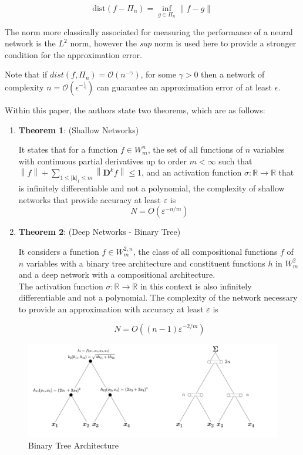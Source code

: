 \documentclass[11pt,a4paper]{article}
\theoremstyle{plain}
\theoremstyle{definition}
\theoremstyle{remark}
\begin{document}
\[
    \text{dist} (f  - \Pi_{n}) = \inf_{g \in \Pi_{n}} \left\| f - g \right\|
\]

The norm more classically associated for measuring the performance of a neural network is the \(L^2\) norm, however the \textit{sup} norm is used here to provide a stronger condition for the approximation error.

Note that if \(dist(f, \Pi_{n}) = \mathcal{O}(n^{-\gamma} )\), for some \(\gamma > 0\)  then a network of complexity \(n = \mathcal{O}(\epsilon^{-\frac{1}{\gamma }}) \) can guarantee an approximation error of at least \(\epsilon \).

Within this paper, the authors state two theorems, which are as follows:

\begin{enumerate}
    
\item \textbf{Theorem 1}: (Shallow Networks)

It states that for a function \( f \in W_{m}^{n} \), the set of all functions of \(n\) variables with continuous partial derivatives up to order \(m < \infty \) such that \(\left\lVert f\right\rVert + \sum_{1\leq \left\vert \mathbf{k}  \right\vert_{1} \leq m} \left\lVert \mathbf{D}^{k} f\right\rVert \leq 1  \), and an activation function \( \sigma: \mathbb{R} \rightarrow \mathbb{R} \) that is infinitely differentiable and not a polynomial, the complexity of shallow networks that provide accuracy at least \( \varepsilon \) is 
\[ N = O(\varepsilon^{-n/m}) \]

\item \textbf{Theorem 2}: (Deep Networks - Binary Tree)

It considers a function \( f \in W_{m}^{2,n} \), the class of all compositional functions \(f\) of \(n\) variables with a binary tree architecture and constituent functions \(h\)  in \(W_{m}^{2}\)  and a deep network with a compositional architecture.\\
The activation function \( \sigma: \mathbb{R} \rightarrow \mathbb{R} \) in this context is also infinitely differentiable and not a polynomial. The complexity of the network necessary to provide an approximation with accuracy at least \( \varepsilon \) is 

\[ N = O((n - 1)\varepsilon^{-2/m}) \]
\end{enumerate}

\begin{figure}[h]
    \centering
    \includegraphics[width=\textwidth]{diags/BinaryTree.png}
    \caption{Binary Tree Architecture}
    \label{fig:}
\end{figure}
\end{document}
